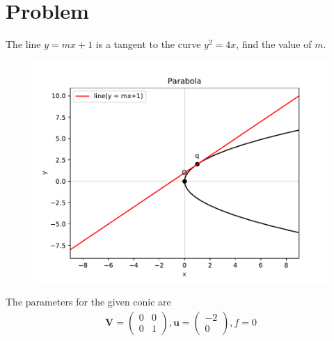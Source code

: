 \documentclass[10pt, a4paper]{article}
\title{\mytitle}
\author{\myauthor\hspace{1em}\\\contact\\FWC22040\hspace{6.5em}IITH\hspace{0.5em}\mymodule\hspace{6em}ASSIGN-6}
\date{}
\newcommand{\myvec}[1]{\ensuremath{\begin{pmatrix}#1\end{pmatrix}}}
\let\vec\mathbf
\begin{document}
 \maketitle
 \tableofcontents
 \section{Problem}
 \fi
 The line $y=mx+1$ is a tangent to the curve $y^2 = 4x$, find the value of $m$. 
 \\
 \solution 
	\begin{figure}[!h]
		\centering
 \includegraphics[width=\columnwidth]{chapters/12/6/6/21/figs/im.pdf}
		\caption{}
		\label{fig:12/6/6/21}
  	\end{figure}

The parameters for the given conic are
\begin{align}
    \vec{V} = \myvec{0&0\\0&1}, \vec{u} = \myvec{-2\\0}, f = 0
\end{align}
\end{document}
